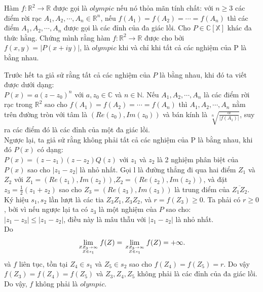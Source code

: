 \begin{baitap}
Hàm $f:\mathbb{R}^2 \rightarrow \mathbb {R}$
 được gọi là $olympic$ nếu nó thỏa mãn tính chất: với $n \geq 3$ các điểm rời rạc $ 
A_1,A_2, \cdots, A_n \in \mathbb{R}^n$, nếu $f(A_1)=f(A_2)=\cdots=f(A_n)$ thì các 
điểm $A_1,A_2,\cdots, A_n$ được gọi là các đỉnh của đa giác lồi. Cho $P \in 
\mathbb{C[X]}$ khác đa thức hằng. Chứng mình rằng hàm $f:\mathbb{R}^2 \rightarrow 
\mathbb{R}$ được cho bởi $f(x,y)=\left|P(x+iy)\right|$, là $olympic$ khi và chỉ khi tất cả 
các nghiệm của P là bằng nhau.

\begin{loigiai4}
Trước hết ta giả sử rằng tất cả các nghiệm của $P$ là bằng nhau, khi đó ta viết được dưới dạng:\\
$P(x)=a(z-z_0)^n$ với $a, z_0 \in \mathbb{C}$ và $n\in \mathbb{N}$. Nếu $ A_1,A_2,\cdots, A_n$ là các điểm rời rạc trong $\mathbb{R}^2$ sao cho $f(A_1)=f(A_2)=\cdots=f(A_n)$ thì $A_1, A_2, \cdots, A_n$ nằm trên đường tròn với tâm là $(Re(z_0), Im(z_0))$ và bán kính là $\sqrt[n]{\frac{\alpha}{\left|f(A_1)\right|}}$, suy ra các điểm đó là các đỉnh của một đa giác lồi. \\
Ngược lại, ta giả sử rằng không phải tất cả các nghiệm của P là bằng nhau, khi đó $P(x)$ có dạng:\\
$P(x)=(z-z_1)(z-z_2)Q(z)$ với $z_1$ và $z_2$ là 2 nghiệm phân biệt của $P(x)$ sao cho $\left|z_1-z_2\right|$ là nhỏ nhất. Gọi l là đường thẳng đi qua hai điểm $Z_1$ và $Z_2$ với $Z_1=(Re(z_1),Im(z_2))$,$Z_2=(Re(z_2),Im(z_2))$, và đặt $z_3=\frac{1}{2}(z_1+z_2)$ sao cho $Z_3=(Re(z_3),Im(z_3))$ là trung điểm của $\overline{Z_1Z_2}$. Ký hiệu $ s_1, s_2$ lần lượt là các tia $ Z_3Z_1,Z_3Z_2$, và $r=f(Z_3) \geq 0$. Ta phải có $r\ge 0$, bởi vì nếu ngược lại ta có $z_3$ là một nghiệm của $P$ sao cho:\\
$\left|z_1-z_3\right|\le \left|z_1-z_2\right|$, điều này là mâu thẫu với $\left|z_1-z_2\right|$ là nhỏ nhất. \\
Do $$ \lim_{ZZ_3\to\infty\atop Z\in s_1}f(Z) =\lim_{ZZ_3\to\infty\atop Z\in s_1}f(Z)=+\infty. $$ 
và $f$ liên tục, tồn tại $Z_4 \in s_1$ và $Z_5 \in s_2$ sao cho $ f(Z_4)=f(Z_5)=r$. Do vậy $ f(Z_3)=f(Z_4)=f(Z_5)$ và $Z_3, Z_4, Z_5$ không phải là các đỉnh của đa giác lồi. Do vậy, $f$ không phải là $olympic$.
\end{loigiai4}
\end{baitap}

